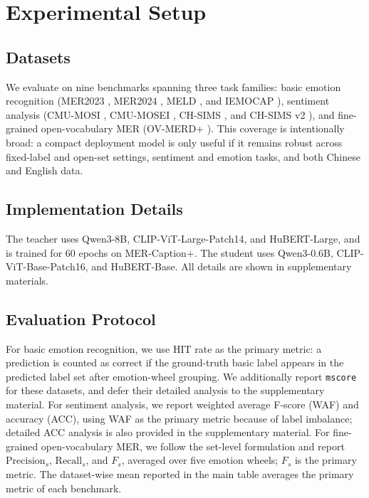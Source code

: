 \documentclass[sigconf]{acmart}
\begin{document}
\section{Experimental Setup}

\subsection{Datasets}

We evaluate on nine benchmarks spanning three task families: basic emotion recognition (MER2023 \cite{MER2023}, MER2024 \cite{MER2024}, MELD \cite{MELD}, and IEMOCAP \cite{IEMOCAP}), sentiment analysis (CMU-MOSI \cite{CMU-MOSI}, CMU-MOSEI \cite{CMU-MOSEI}, CH-SIMS \cite{CH-SIMS}, and CH-SIMS v2 \cite{CH-SIMv2}), and fine-grained open-vocabulary MER (OV-MERD+ \cite{OV-MERD+}). This coverage is intentionally broad: a compact deployment model is only useful if it remains robust across fixed-label and open-set settings, sentiment and emotion tasks, and both Chinese and English data.

\subsection{Implementation Details}

The teacher uses Qwen3-8B, CLIP-ViT-Large-Patch14, and HuBERT-Large, and is trained for 60 epochs on MER-Caption+. The student uses Qwen3-0.6B, CLIP-ViT-Base-Patch16, and HuBERT-Base. All details are shown in supplementary materials.


\subsection{Evaluation Protocol}

For basic emotion recognition, we use HIT rate as the primary metric: a prediction is counted as correct if the ground-truth basic label appears in the predicted label set after emotion-wheel grouping. We additionally report \texttt{mscore} for these datasets, and defer their detailed analysis to the supplementary material. For sentiment analysis, we report weighted average F-score (WAF) and accuracy (ACC), using WAF as the primary metric because of label imbalance; detailed ACC analysis is also provided in the supplementary material. For fine-grained open-vocabulary MER, we follow the set-level formulation and report $\mathrm{Precision}_s$, $\mathrm{Recall}_s$, and $F_s$, averaged over five emotion wheels; $F_s$ is the primary metric. The dataset-wise mean reported in the main table averages the primary metric of each benchmark. 
\end{document}
